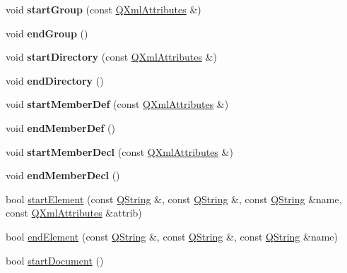 \begin{DoxyCompactItemize}
\item 
\hypertarget{class_layout_parser_a86a428bf466a3b64fd85d6ca7bf5b1f3}{void {\bfseries start\-Group} (const \hyperlink{class_q_xml_attributes}{Q\-Xml\-Attributes} \&)}\label{class_layout_parser_a86a428bf466a3b64fd85d6ca7bf5b1f3}

\item 
\hypertarget{class_layout_parser_af964cd7bde81d0f118ea09e201e155dd}{void {\bfseries end\-Group} ()}\label{class_layout_parser_af964cd7bde81d0f118ea09e201e155dd}

\item 
\hypertarget{class_layout_parser_ae14475337ad99e146f20f4b7808c72bd}{void {\bfseries start\-Directory} (const \hyperlink{class_q_xml_attributes}{Q\-Xml\-Attributes} \&)}\label{class_layout_parser_ae14475337ad99e146f20f4b7808c72bd}

\item 
\hypertarget{class_layout_parser_a49c2176dcdac2ebde29fe79bc49f8896}{void {\bfseries end\-Directory} ()}\label{class_layout_parser_a49c2176dcdac2ebde29fe79bc49f8896}

\item 
\hypertarget{class_layout_parser_ae677048d5ae480f426c95655f4646fbc}{void {\bfseries start\-Member\-Def} (const \hyperlink{class_q_xml_attributes}{Q\-Xml\-Attributes} \&)}\label{class_layout_parser_ae677048d5ae480f426c95655f4646fbc}

\item 
\hypertarget{class_layout_parser_a73b2d6cbc55c754fce411773933a674f}{void {\bfseries end\-Member\-Def} ()}\label{class_layout_parser_a73b2d6cbc55c754fce411773933a674f}

\item 
\hypertarget{class_layout_parser_a2690ab9cdf2dbaf5448c3f3928a59fdd}{void {\bfseries start\-Member\-Decl} (const \hyperlink{class_q_xml_attributes}{Q\-Xml\-Attributes} \&)}\label{class_layout_parser_a2690ab9cdf2dbaf5448c3f3928a59fdd}

\item 
\hypertarget{class_layout_parser_a91ab0b2fe78af54f3d87f97fe134e1cf}{void {\bfseries end\-Member\-Decl} ()}\label{class_layout_parser_a91ab0b2fe78af54f3d87f97fe134e1cf}

\item 
bool \hyperlink{class_layout_parser_a3ebad496b56e71d502ae20cafd62d524}{start\-Element} (const \hyperlink{class_q_string}{Q\-String} \&, const \hyperlink{class_q_string}{Q\-String} \&, const \hyperlink{class_q_string}{Q\-String} \&name, const \hyperlink{class_q_xml_attributes}{Q\-Xml\-Attributes} \&attrib)
\item 
bool \hyperlink{class_layout_parser_abd7a2eb8d83ec76ec743ddd66a11d2af}{end\-Element} (const \hyperlink{class_q_string}{Q\-String} \&, const \hyperlink{class_q_string}{Q\-String} \&, const \hyperlink{class_q_string}{Q\-String} \&name)
\item 
bool \hyperlink{class_layout_parser_af5342502614ae37eaa64a8d3e404027d}{start\-Document} ()
\end{DoxyCompactItemize}
